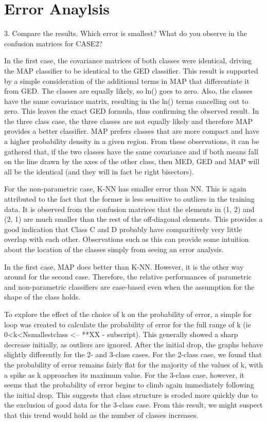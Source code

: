 \section{Error Anaylsis}
3.	Compare the results. Which error is smallest? What do you observe in the confusion matrices for CASE2?

In the first case, the covariance matrices of both classes were identical, driving the MAP classifier to be identical to the GED classifier.  This result is supported by a simple consideration of the additional terms in MAP that differentiate it from GED.  The classes are equally likely, so ln(\Theta) goes to zero.  Also, the classes have the same covariance matrix, resulting in the ln(\Sigma) terms cancelling out to zero.  This leaves the exact GED formula, thus confirming the observed result.  In the three class case, the three classes are not equally likely and therefore MAP provides a better classifier. MAP prefers classes that are more compact and have a higher probability density in a given region. From these observations, it can be gathered that, if the two classes have the same covariance and if both means fall on the line drawn by the axes of the other class, then MED, GED and MAP will all be the identical (and they will in fact be right bisectors).

For the non-parametric case, K-NN has smaller error than NN. This is again attributed to the fact that the former is less sensitive to outliers in the training data. It is observed from the confusion matrices that the elements in (1, 2) and (2, 1) are much smaller than the rest of the off-diagonal elements. This provides a good indication that Class C and D probably have comparitively very little overlap with each other.  Observations such as this can provide some intuition about the location of the classes simply from seeing an error analysis.

In the first case, MAP does better than K-NN. However, it is the other way around for the second case. Therefore, the relative performances of parametric and non-parametric classifiers are case-based even when the assumption for the shape of the class holds.

To explore the effect of the choice of k on the probability of error, a simple for loop was created to calculate the probability of error for the full range of k (ie 0<k<Nsmallestclass <-- **XX - subscript).  This generally showed a sharp decrease initially, as outliers are ignored.  After the initial drop, the graphs behave slightly differently for the 2- and 3-class cases.  For the 2-class case, we found that the probability of error remains fairly flat for the majority of the values of k, with a spike as k approaches its maximum value.  For the 3-class case, however, it seems that the probability of error begins to climb again immediately following the initial drop.  This suggests that class structure is eroded more quickly due to the exclusion of good data for the 3-class case.  From this result, we might suspect that this trend would hold as the number of classes increases.
